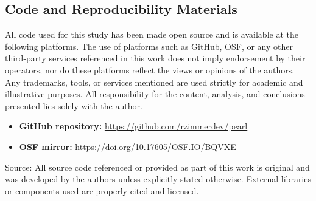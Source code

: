 
\begin{apendicesenv}

\partapendices

\chapter{Code and Reproducibility Materials}
\label{ch:code}

All code used for this study has been made open source and is available at the following platforms.
The use of platforms such as GitHub, OSF, or any other third-party services referenced in this work does not imply endorsement
by their operators, nor do these platforms reflect the views or opinions of the authors.
Any trademarks, tools, or services mentioned are used strictly for academic and illustrative purposes.
All responsibility for the content, analysis, and conclusions presented lies solely with the author.

\begin{itemize}
    \item \textbf{GitHub repository:} \url{https://github.com/rzimmerdev/pearl}
    \item \textbf{OSF mirror:} \url{https://doi.org/10.17605/OSF.IO/BQVXE}
\end{itemize}
\begin{flushleft}
    Source: All source code referenced or provided as part of this work is original and was developed by the authors unless explicitly stated otherwise.
    External libraries or components used are properly cited and licensed.
\end{flushleft}

\end{apendicesenv}
